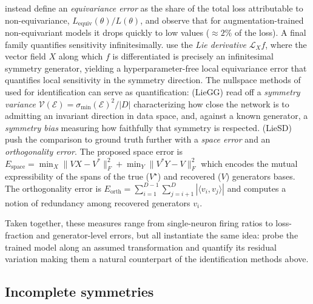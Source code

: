 \documentclass[mathematics,review,submit,moreauthors]{Definitions/mdpi}
\begin{document}
\citet{shen2026} instead define an \emph{equivariance error} as the share of the total loss attributable to non-equivariance, $L_{\mathrm{equiv}}(\theta)/L(\theta)$, and observe that for augmentation-trained non-equivariant models it drops quickly to low values ($\approx 2\%$ of the loss).\newline
A final family quantifies sensitivity infinitesimally.
\citet{gruver2024} use the \emph{Lie derivative} $\mathcal{L}_X f$, where the vector field $X$ along which $f$ is differentiated is precisely an infinitesimal symmetry generator, yielding a hyperparameter-free local equivariance error that quantifies local sensitivity in the symmetry direction.
The nullspace methods of  used for identification can serve as quantification: \citet{moskalev2023} (LieGG) read off a \emph{symmetry variance} $\mathcal{V}(\mathcal{E}) = \sigma_{\min}(\mathcal{E})^2/|D|$ characterizing how close the network is to admitting an invariant direction in data space, and, against a known generator, a \emph{symmetry bias} measuring how faithfully that symmetry is respected.
\citet{hu2025nn} (LieSD) push the comparison to ground truth further with a \emph{space error} and an \emph{orthogonality error}.
The proposed space error is $E_{\text{space}} = \min_{X} \|VX - V^*\|_F^2 + \min_{Y} \|V^*Y - V\|_F^2$ which encodes the mutual expressibility of the spans of the true ($V^\star$) and recovered ($V$) generators bases.
The orthogonality error is $E_{\text{orth}} = \sum_{i=1}^{D-1} \sum_{j=i+1}^{D} |\langle v_i, v_j \rangle|$ and computes a notion of redundancy among recovered generators $v_i$.

Taken together, these measures range from single-neuron firing ratios to loss-fraction and generator-level errors, but all instantiate the same idea: probe the trained model along an assumed transformation and quantify its residual variation making them a natural counterpart of the identification methods above.



\subsection{Incomplete symmetries}\label{sec:incomplete-symmetries}
\end{document}
